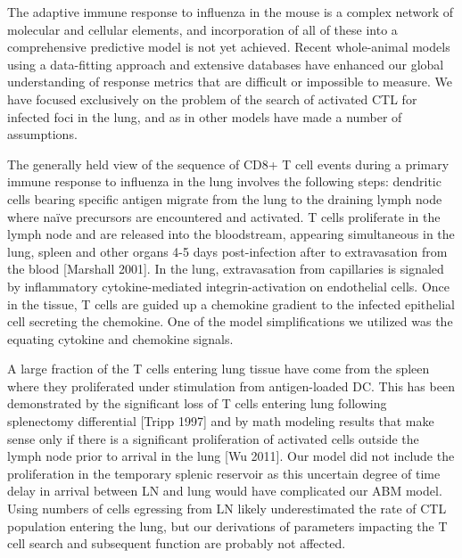 \documentclass[10pt]{article}
\begin{document}
The adaptive immune response to influenza in the mouse is a complex network of molecular and cellular elements, and incorporation of all of these into a comprehensive predictive model is not yet achieved.  Recent whole-animal models using a data-fitting approach and extensive databases have enhanced our global understanding of response metrics that are difficult or impossible to measure.  We have focused exclusively on the problem of the search of activated CTL for infected foci in the lung, and as in other models have made a number of assumptions.

The generally held view of the sequence of CD8+ T cell events during a primary immune response to influenza in the lung involves the following steps: dendritic cells bearing specific antigen migrate from the lung to the draining lymph node where naïve precursors are encountered and activated.  T cells proliferate in the lymph node and are released into the bloodstream, appearing simultaneous in the lung, spleen and other organs 4-5 days post-infection after to extravasation from the blood [Marshall 2001].   In the lung, extravasation from capillaries is signaled by inflammatory cytokine-mediated integrin-activation on endothelial cells.  Once in the tissue, T cells are guided up a chemokine gradient to the infected epithelial cell secreting the chemokine.  One of the model simplifications we utilized was the equating cytokine and chemokine signals.

A large fraction of the T cells entering lung tissue have come from the spleen where they proliferated under stimulation from antigen-loaded DC.  This has been demonstrated by the significant loss of T cells entering lung following splenectomy differential [Tripp 1997] and by math modeling results that make sense only if there is a significant proliferation of activated cells outside the lymph node prior to arrival in the lung [Wu 2011].  Our model did not include the proliferation in the temporary splenic reservoir as this uncertain degree of time delay in arrival between LN and lung would have complicated our ABM model.  Using numbers of cells egressing from LN likely underestimated the rate of CTL population entering the lung, but our derivations of parameters impacting the T cell search and subsequent function are probably not affected.
\end{document}
